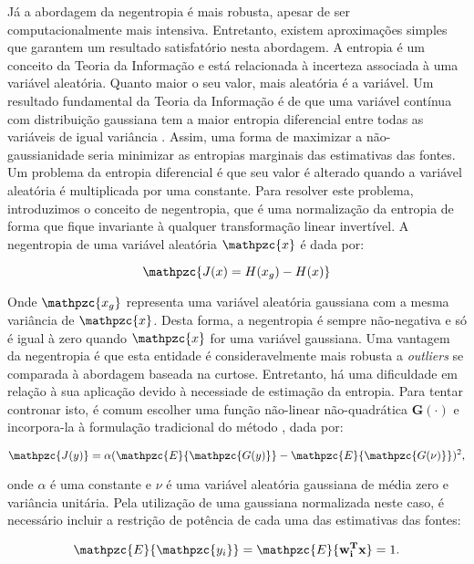         
    Já a abordagem da negentropia é mais robusta, apesar de ser computacionalmente mais intensiva. Entretanto, existem aproximações simples que garantem um resultado satisfatório nesta abordagem. A entropia é um conceito da Teoria da Informação e está relacionada à incerteza associada à uma variável aleatória. Quanto maior o seu valor, mais aleatória é a variável. Um resultado fundamental da Teoria da Informação é de que uma variável contínua com distribuição gaussiana tem a maior entropia diferencial entre todas as variáveis de igual variância \cite{entropy}. Assim, uma forma de maximizar a não-gaussianidade seria minimizar as entropias marginais das estimativas das fontes. Um problema da entropia diferencial é que seu valor é alterado quando a variável aleatória é multiplicada por uma constante. Para resolver este problema, introduzimos o conceito de negentropia, que é uma normalização da entropia de forma que fique invariante à qualquer transformação linear invertível. A negentropia de uma variável aleatória $\mathpzc{x}$ é dada por:
    
    \begin{equation}
        \mathpzc{J(x) = H(x_g) - H(x)}
    \end{equation}
    
    Onde $\mathpzc{x_g}$ representa uma variável aleatória gaussiana com a mesma variância de $\mathpzc{x}$. Desta forma, a negentropia é sempre não-negativa e só é igual à zero quando $\mathpzc{x}$ for uma variável gaussiana. Uma vantagem da negentropia é que esta entidade é consideravelmente mais robusta a \textit{outliers} se comparada à abordagem baseada na curtose.
    Entretanto, há uma dificuldade em relação à sua aplicação devido à necessiade de estimação da entropia. Para tentar contronar isto, é comum escolher uma função não-linear não-quadrática $\mathbf{G(\cdot)}$ e incorpora-la à formulação tradicional do método \cite{ICAgauss}, dada por:
    
    \begin{equation}
        \mathpzc{J(y)} = \alpha(\mathpzc{E}\{\mathpzc{G(y)}\} - \mathpzc{E}\{\mathpzc{G(\nu)}\})^2,
    \end{equation}
    
    onde $\alpha$ é uma constante e $\nu$ é uma variável aleatória gaussiana de média zero e variância unitária. Pela utilização de uma gaussiana normalizada neste caso, é necessário incluir a restrição de potência de cada uma das estimativas das fontes:
    
    \begin{equation}
        \mathpzc{E}\{\mathpzc{y_i}\} = \mathpzc{E}\{\mathbf{w_i^Tx}\} = 1.
    \end{equation}
    
